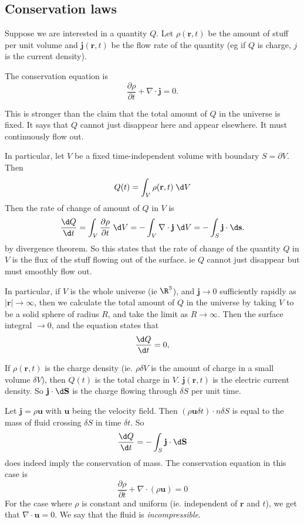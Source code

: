 \documentclass[a4paper]{article}
\begin{document}
\subsection{Conservation laws}
\begin{defi}
  Suppose we are interested in a quantity $Q$. Let $\rho(\mathbf{r}, t)$ be the amount of stuff per unit volume and $\mathbf{j}(\mathbf{r}, t)$ be the flow rate of the quantity (eg if $Q$ is charge, $j$ is the current density). 

  The conservation equation is
  \[
    \frac{\partial \rho}{\partial t} + \nabla\cdot \mathbf{j} = 0.
  \]
\end{defi}
This is stronger than the claim that the total amount of $Q$ in the universe is fixed. It says that $Q$ cannot just disappear here and appear elsewhere. It must continuously flow out.

In particular, let $V$ be a fixed time-independent volume with boundary $S = \partial V$. Then
\[
  Q(t) = \int_V \rho (\mathbf{r}, t)\; \d V
\]
Then the rate of change of amount of $Q$ in $V$ is
\[
  \frac{\d Q}{\d t} = \int_V \frac{\partial \rho }{\partial t}\;\d V = -\int_V \nabla \cdot \mathbf{j}\;\d V = -\int_S \mathbf{j}\cdot \d \mathbf{s}.
\]
by divergence theorem. So this states that the rate of change of the quantity $Q$ in $V$ is the flux of the stuff flowing out of the surface. ie $Q$ cannot just disappear but must smoothly flow out.

In particular, if $V$ is the whole universe (ie $\R^3$), and $\mathbf{j}\to 0$ sufficiently rapidly as $|\mathbf{r}| \to \infty$, then we calculate the total amount of $Q$ in the universe by taking $V$ to be a solid sphere of radius $R$, and take the limit as $R\to \infty$. Then the surface integral $\to 0$, and the equation states that
\[
  \frac{\d Q}{\d t} = 0,
\]
\begin{eg}
  If $\rho(\mathbf{r}, t)$ is the charge density (ie. $\rho\delta V$ is the amount of charge in a small volume $\delta V$), then $Q(t)$ is the total charge in $V$. $\mathbf{j}(\mathbf{r}, t)$ is the electric current density. So $\mathbf{j}\cdot \d \mathbf{S}$ is the charge flowing through $\delta S$ per unit time.
\end{eg}

\begin{eg}
  Let $\mathbf{j} = \rho \mathbf{u}$ with $\mathbf{u}$ being the velocity field. Then $(\rho\mathbf{u} \delta t)\cdot n\delta S$ is equal to the mass of fluid crossing $\delta S$ in time $\delta t$. So
  \[
    \frac{\d Q}{\d t} = -\int_S \mathbf{j}\cdot \d \mathbf{S}
  \]
  does indeed imply the conservation of mass. The conservation equation in this case is
  \[
    \frac{\partial \rho}{\partial t} + \nabla\cdot (\rho \mathbf{u}) = 0
  \]
  For the case where $\rho$ is constant and uniform (ie. independent of $\mathbf{r}$ and $t$), we get that $\nabla\cdot \mathbf{u} = 0$. We say that the fluid is \emph{incompressible}.
\end{eg}
\end{document}
